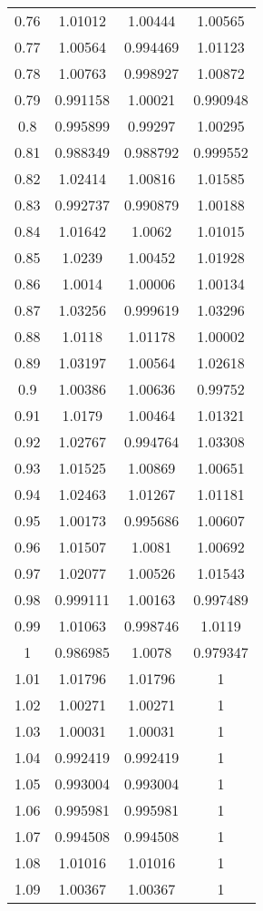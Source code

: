 \begin{table}[h!]
\begin{tabular}{|c|c|c|c|}
0.76 & 1.01012 & 1.00444 & 1.00565 \\
0.77 & 1.00564 & 0.994469 & 1.01123 \\
0.78 & 1.00763 & 0.998927 & 1.00872 \\
0.79 & 0.991158 & 1.00021 & 0.990948 \\
0.8 & 0.995899 & 0.99297 & 1.00295 \\
0.81 & 0.988349 & 0.988792 & 0.999552 \\
0.82 & 1.02414 & 1.00816 & 1.01585 \\
0.83 & 0.992737 & 0.990879 & 1.00188 \\
0.84 & 1.01642 & 1.0062 & 1.01015 \\
0.85 & 1.0239 & 1.00452 & 1.01928 \\
0.86 & 1.0014 & 1.00006 & 1.00134 \\
0.87 & 1.03256 & 0.999619 & 1.03296 \\
0.88 & 1.0118 & 1.01178 & 1.00002 \\
0.89 & 1.03197 & 1.00564 & 1.02618 \\
0.9 & 1.00386 & 1.00636 & 0.99752 \\
0.91 & 1.0179 & 1.00464 & 1.01321 \\
0.92 & 1.02767 & 0.994764 & 1.03308 \\
0.93 & 1.01525 & 1.00869 & 1.00651 \\
0.94 & 1.02463 & 1.01267 & 1.01181 \\
0.95 & 1.00173 & 0.995686 & 1.00607 \\
0.96 & 1.01507 & 1.0081 & 1.00692 \\
0.97 & 1.02077 & 1.00526 & 1.01543 \\
0.98 & 0.999111 & 1.00163 & 0.997489 \\
0.99 & 1.01063 & 0.998746 & 1.0119 \\
1 & 0.986985 & 1.0078 & 0.979347 \\
1.01 & 1.01796 & 1.01796 & 1 \\
1.02 & 1.00271 & 1.00271 & 1 \\
1.03 & 1.00031 & 1.00031 & 1 \\
1.04 & 0.992419 & 0.992419 & 1 \\
1.05 & 0.993004 & 0.993004 & 1 \\
1.06 & 0.995981 & 0.995981 & 1 \\
1.07 & 0.994508 & 0.994508 & 1 \\
1.08 & 1.01016 & 1.01016 & 1 \\
1.09 & 1.00367 & 1.00367 & 1 \\

\end{tabular}
\end{table}
